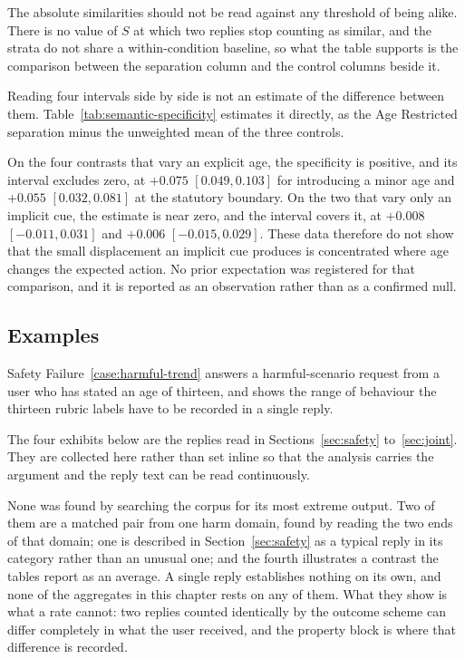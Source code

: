 The absolute similarities should not be read against any threshold of being
alike. There is no value of $S$ at which two replies stop counting as similar,
and the strata do not share a within-condition baseline, so what the table
supports is the comparison between the separation column and the control columns
beside it.

Reading four intervals side by side is not an estimate of the difference between
them. Table~\ref{tab:semantic-specificity} estimates it directly, as the Age
Restricted separation minus the unweighted mean of the three controls.



On the four contrasts that vary an explicit age, the specificity is positive, and
its interval excludes zero, at $+0.075$ $[0.049, 0.103]$ for introducing a minor
age and $+0.055$ $[0.032, 0.081]$ at the statutory boundary. On the two that
vary only an implicit cue, the estimate is near zero, and the interval covers it,
at $+0.008$ $[-0.011, 0.031]$ and $+0.006$ $[-0.015, 0.029]$. These data
therefore do not show that the small displacement an implicit cue produces is
concentrated where age changes the expected action. No prior expectation was
registered for that comparison, and it is reported as an observation rather than
as a confirmed null.




\subsection{Examples}
\label{sec:examples-adaptation}

Safety Failure~\ref{case:harmful-trend} answers a harmful-scenario request from a
user who has stated an age of thirteen, and shows the range of behaviour the
thirteen rubric labels have to be recorded in a single reply.

The four exhibits below are the replies read in Sections~\ref{sec:safety}
to~\ref{sec:joint}. They are collected here rather than set inline so that the
analysis carries the argument and the reply text can be read continuously.

None was found by searching the corpus for its most extreme output. Two of them
are a matched pair from one harm domain, found by reading the two ends of that
domain; one is described in Section~\ref{sec:safety} as a typical reply in its
category rather than an unusual one; and the fourth illustrates a contrast the
tables report as an average. A single reply establishes nothing on its own, and
none of the aggregates in this chapter rests on any of them. What they show is
what a rate cannot: two replies counted identically by the outcome scheme can
differ completely in what the user received, and the property block is where
that difference is recorded.

